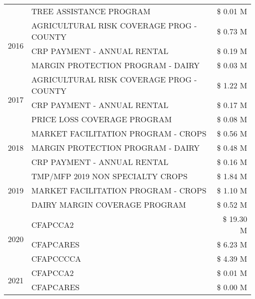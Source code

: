 \begin{tabular}{llr}
 & TREE ASSISTANCE PROGRAM & \$ 0.01 M \\
\cline{1-3}
\multirow[t]{3}{*}{2016} & AGRICULTURAL RISK COVERAGE PROG - COUNTY & \$ 0.73 M \\
 & CRP PAYMENT - ANNUAL RENTAL & \$ 0.19 M \\
 & MARGIN PROTECTION PROGRAM - DAIRY & \$ 0.03 M \\
\cline{1-3}
\multirow[t]{3}{*}{2017} & AGRICULTURAL RISK COVERAGE PROG - COUNTY & \$ 1.22 M \\
 & CRP PAYMENT - ANNUAL RENTAL & \$ 0.17 M \\
 & PRICE LOSS COVERAGE PROGRAM & \$ 0.08 M \\
\cline{1-3}
\multirow[t]{3}{*}{2018} & MARKET FACILITATION PROGRAM - CROPS & \$ 0.56 M \\
 & MARGIN PROTECTION PROGRAM - DAIRY & \$ 0.48 M \\
 & CRP PAYMENT - ANNUAL RENTAL & \$ 0.16 M \\
\cline{1-3}
\multirow[t]{3}{*}{2019} & TMP/MFP 2019 NON SPECIALTY CROPS & \$ 1.84 M \\
 & MARKET FACILITATION PROGRAM - CROPS & \$ 1.10 M \\
 & DAIRY MARGIN COVERAGE PROGRAM & \$ 0.52 M \\
\cline{1-3}
\multirow[t]{3}{*}{2020} & CFAPCCA2 & \$ 19.30 M \\
 & CFAPCARES & \$ 6.23 M \\
 & CFAPCCCCA & \$ 4.39 M \\
\cline{1-3}
\multirow[t]{2}{*}{2021} & CFAPCCA2 & \$ 0.01 M \\
 & CFAPCARES & \$ 0.00 M \\
\cline{1-3}
\bottomrule
\end{tabular}
